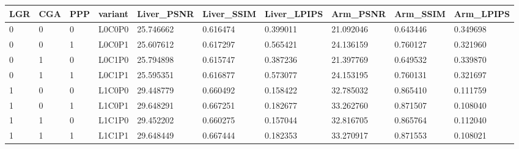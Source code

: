 \begin{tabular}{llllllllll}
LGR & CGA & PPP & variant & Liver\_PSNR & Liver\_SSIM & Liver\_LPIPS & Arm\_PSNR & Arm\_SSIM & Arm\_LPIPS \\
\hline
0 & 0 & 0 & L0C0P0 & 25.746662 & 0.616474 & 0.399011 & 21.092046 & 0.643446 & 0.349698 \\
0 & 0 & 1 & L0C0P1 & 25.607612 & 0.617297 & 0.565421 & 24.136159 & 0.760127 & 0.321960 \\
0 & 1 & 0 & L0C1P0 & 25.794898 & 0.615747 & 0.387236 & 21.397769 & 0.649532 & 0.339870 \\
0 & 1 & 1 & L0C1P1 & 25.595351 & 0.616877 & 0.573077 & 24.153195 & 0.760131 & 0.321697 \\
1 & 0 & 0 & L1C0P0 & 29.448779 & 0.660492 & 0.158422 & 32.785032 & 0.865410 & 0.111759 \\
1 & 0 & 1 & L1C0P1 & 29.648291 & 0.667251 & 0.182677 & 33.262760 & 0.871507 & 0.108040 \\
1 & 1 & 0 & L1C1P0 & 29.452202 & 0.660275 & 0.157044 & 32.816705 & 0.865764 & 0.112040 \\
1 & 1 & 1 & L1C1P1 & 29.648449 & 0.667444 & 0.182353 & 33.270917 & 0.871553 & 0.108021 \\
\end{tabular}
